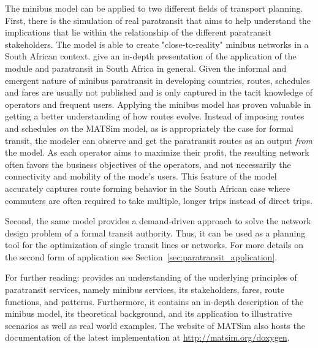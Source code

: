 The minibus model can be applied to two different fields of transport planning. First, there is the simulation of real paratransit that aims to help understand the implications that lie within the relationship of the different paratransit stakeholders. The model is able to create "close-to-reality" minibus networks in a South African context. \citet[][]{NeumannEtAl2014MinibusRSA} give an in-depth presentation of the application of the module and paratransit in South Africa in general. Given the informal and emergent nature of minibus paratransit in developing countries, routes, schedules and fares are usually not published and is only captured in the tacit knowledge of operators and frequent users. Applying the minibus model has proven valuable in getting a better understanding of how routes evolve. Instead of imposing routes and schedules \emph{on} the MATSim model, as is appropriately the case for formal transit, the modeler can observe and get the paratransit routes as an output \emph{from} the model. As each operator aims to maximize their profit, the resulting network often favors the business objectives of the operators, and not necessarily the connectivity and mobility of the mode's users. This feature of the model accurately captures route forming behavior in the South African case where commuters are often required to take multiple, longer trips instead of direct trips.

Second, the same model provides a demand-driven approach to solve the network design problem of a formal transit authority. Thus, it can be used as a planning tool for the optimization of single transit lines or networks. For more details on the second form of application see Section~\ref{sec:paratransit_application}.

For further reading: \citet[][]{Neumann_PhDThesis_2014} provides an understanding of the underlying principles of paratransit services, namely minibus services, its stakeholders, fares, route functions, and patterns. Furthermore, it contains an in-depth description of the minibus model, its theoretical background, and its application to illustrative scenarios as well as real world examples. The website of MATSim also hosts the documentation of the latest implementation at \url{http://matsim.org/doxygen}.

%
